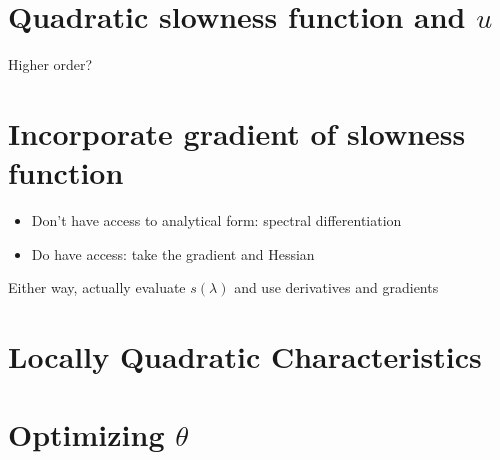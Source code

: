 \documentclass[eikonal.tex]{subfiles}
\begin{document}
\section{Quadratic slowness function and $u$}

Higher order?

\section{Incorporate gradient of slowness function}

\begin{itemize}
\item Don't have access to analytical form: spectral differentiation
\item Do have access: take the gradient and Hessian
\end{itemize}
Either way, actually evaluate $s(\lambda)$ and use derivatives and
gradients

\section{Locally Quadratic Characteristics}


\section{Optimizing $\theta$}
\end{document}
